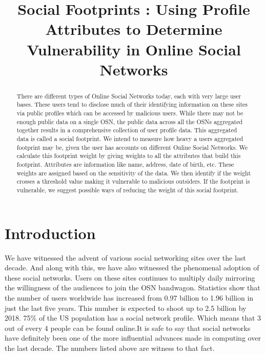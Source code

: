 \documentclass[12pt,conference]{IEEEtran}
\begin{document}
\title{Social Footprints : Using Profile Attributes to Determine Vulnerability in Online Social Networks}

\author{
}

\maketitle

\begin{abstract}
 There are different types of Online Social Networks today, each with very large user bases. These users tend to disclose much of their identifying information on these sites via public profiles which can be accessed by malicious users. While there may not be enough public data on a single OSN, the public data across all the OSNs aggregated together results in a comprehensive collection of user profile data. This aggregated data is called a social footprint. We intend to measure how heavy a users aggregated footprint may be, given the user has accounts on different Online Social Networks. We calculate this footprint weight by giving weights to all the attributes that build this footprint. Attributes are information like name, address, date of birth, etc. These weights are assigned based on the sensitivity of the data. We then identify if the weight crosses a threshold value making it vulnerable to malicious outsiders. If the footprint is vulnerable, we suggest possible ways of reducing the weight of this social footprint.
\end{abstract}


\section{Introduction}
We have witnessed the advent of various social networking sites over the last decade. And along with this, we have also witnessed the phenomenal adoption of these social networks. Users on these sites continues to multiply daily mirroring the willingness of the audiences to join the OSN bandwagon. Statistics show\cite{statswebsite} that the number of users worldwide has increased from 0.97 billion to 1.96 billion in just the last five years. This number is expected to shoot up to 2.5 billion by 2018. 75\% of the US population has a social network profile. Which means that 3 out of every 4 people can be found online.It is safe to say that social networks have definitely been one of the more influential advances made in computing over the last decade. The numbers listed above are witness to that fact.\\
\end{document}
